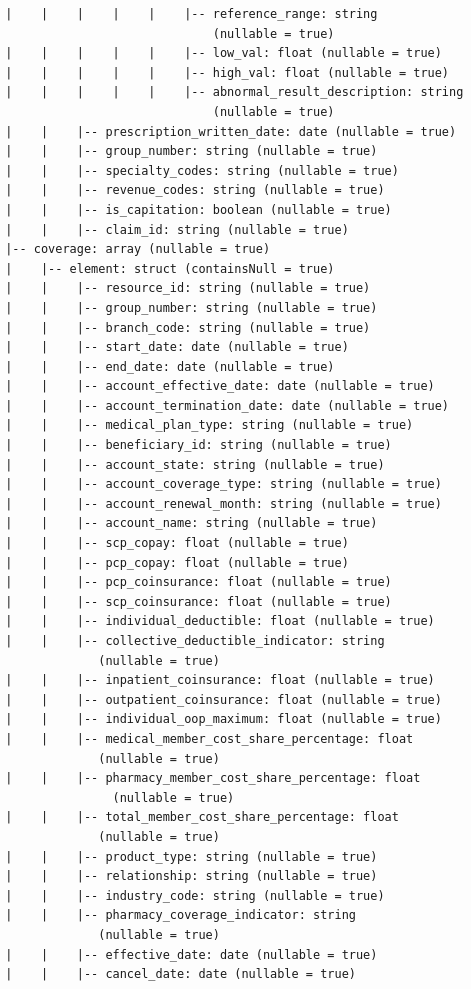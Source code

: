 \documentclass[letterpaper]{article} %
\begin{document}
\begin{verbatim}
 |    |    |    |    |    |-- reference_range: string 
                              (nullable = true)
 |    |    |    |    |    |-- low_val: float (nullable = true)
 |    |    |    |    |    |-- high_val: float (nullable = true)
 |    |    |    |    |    |-- abnormal_result_description: string
                              (nullable = true)
 |    |    |-- prescription_written_date: date (nullable = true)
 |    |    |-- group_number: string (nullable = true)
 |    |    |-- specialty_codes: string (nullable = true)
 |    |    |-- revenue_codes: string (nullable = true)
 |    |    |-- is_capitation: boolean (nullable = true)
 |    |    |-- claim_id: string (nullable = true)
 |-- coverage: array (nullable = true)
 |    |-- element: struct (containsNull = true)
 |    |    |-- resource_id: string (nullable = true)
 |    |    |-- group_number: string (nullable = true)
 |    |    |-- branch_code: string (nullable = true)
 |    |    |-- start_date: date (nullable = true)
 |    |    |-- end_date: date (nullable = true)
 |    |    |-- account_effective_date: date (nullable = true)
 |    |    |-- account_termination_date: date (nullable = true)
 |    |    |-- medical_plan_type: string (nullable = true)
 |    |    |-- beneficiary_id: string (nullable = true)
 |    |    |-- account_state: string (nullable = true)
 |    |    |-- account_coverage_type: string (nullable = true)
 |    |    |-- account_renewal_month: string (nullable = true)
 |    |    |-- account_name: string (nullable = true)
 |    |    |-- scp_copay: float (nullable = true)
 |    |    |-- pcp_copay: float (nullable = true)
 |    |    |-- pcp_coinsurance: float (nullable = true)
 |    |    |-- scp_coinsurance: float (nullable = true)
 |    |    |-- individual_deductible: float (nullable = true)
 |    |    |-- collective_deductible_indicator: string 
              (nullable = true)
 |    |    |-- inpatient_coinsurance: float (nullable = true)
 |    |    |-- outpatient_coinsurance: float (nullable = true)
 |    |    |-- individual_oop_maximum: float (nullable = true)
 |    |    |-- medical_member_cost_share_percentage: float 
              (nullable = true)
 |    |    |-- pharmacy_member_cost_share_percentage: float 
                (nullable = true)
 |    |    |-- total_member_cost_share_percentage: float 
              (nullable = true)
 |    |    |-- product_type: string (nullable = true)
 |    |    |-- relationship: string (nullable = true)
 |    |    |-- industry_code: string (nullable = true)
 |    |    |-- pharmacy_coverage_indicator: string 
              (nullable = true)
 |    |    |-- effective_date: date (nullable = true)
 |    |    |-- cancel_date: date (nullable = true)
\end{verbatim}
\end{document}
